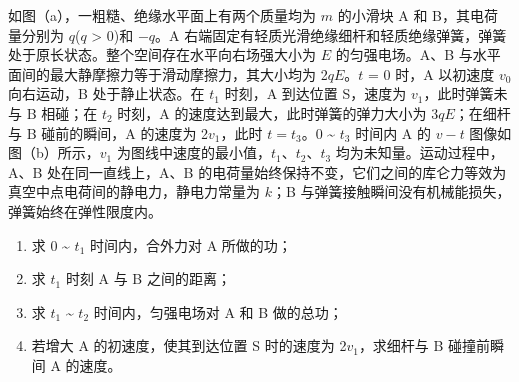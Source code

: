 \documentclass[\gkver]{gaokaozhenti}
\begin{document}
\item
如图（a），一粗糙、绝缘水平面上有两个质量均为 $m$ 的小滑块 A 和 B，其电荷量分别为 $q$($q$ > 0)和 $- q$。A 右端固定有轻质光滑绝缘细杆和轻质绝缘弹簧，弹簧处于原长状态。整个空间存在水平向右场强大小为 $E$ 的匀强电场。A、B 与水平面间的最大静摩擦力等于滑动摩擦力，其大小均为 2$qE$。$t$ = 0 时，A 以初速度 $v_{0}$ 向右运动，B 处于静止状态。在 $t_{1}$ 时刻，A 到达位置 S，速度为 $v_{1}$，此时弹簧未与 B 相碰；在 $t_{2}$ 时刻，A 的速度达到最大，此时弹簧的弹力大小为 3$qE$；在细杆与 B 碰前的瞬间，A 的速度为 2$v_{1}$，此时 $t = t_{3}$。0 \textasciitilde{} $t_{3}$ 时间内 A 的 $v - t$ 图像如图（b）所示，$v_{1}$ 为图线中速度的最小值，$t_{1}$、$t_{2}$、$t_{3}$ 均为未知量。运动过程中，A、B 处在同一直线上，A、B 的电荷量始终保持不变，它们之间的库仑力等效为真空中点电荷间的静电力，静电力常量为 $k$；B 与弹簧接触瞬间没有机械能损失，弹簧始终在弹性限度内。
\begin{enumerate}
	\item
	求 0 \textasciitilde{} $t_{1}$ 时间内，合外力对 A 所做的功；
	\item
	求 $t_{1}$ 时刻 A 与 B 之间的距离；
	\item
	求 $t_{1}$ \textasciitilde{} $t_{2}$ 时间内，匀强电场对 A 和 B 做的总功；
	\item
	若增大 A 的初速度，使其到达位置 S 时的速度为 2$v_{1}$，求细杆与 B 碰撞前瞬间 A 的速度。
\end{enumerate}
\end{document}

